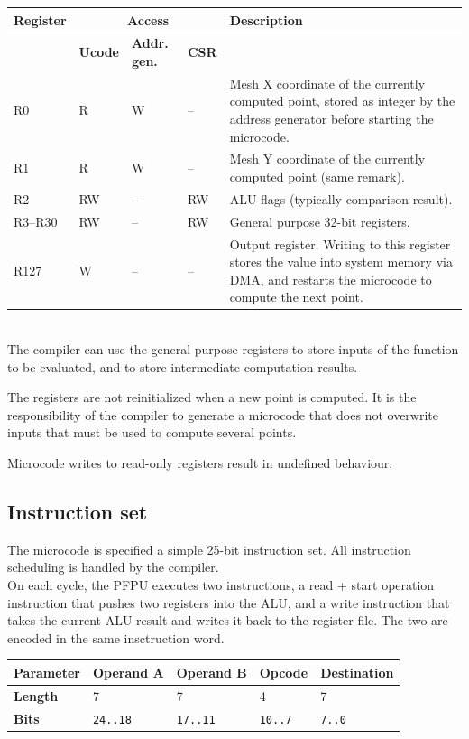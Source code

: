 \documentclass[a4paper,11pt]{article}
\begin{document}
\begin{tabularx}{\textwidth}{|l|l|l|l|X|}
\hline
\bf Register & \multicolumn{3}{|c|}{\bf Access} & \bf Description \\
\hline
 & \bf Ucode & \bf Addr. gen. & \bf CSR & \\
\hline
R0 & R & W & -- & Mesh X coordinate of the currently computed point, stored as integer by the address generator before starting the microcode. \\
\hline
R1 & R & W & -- & Mesh Y coordinate of the currently computed point (same remark). \\
\hline
R2 & RW & -- & RW & ALU flags (typically comparison result). \\
\hline
R3--R30 & RW & -- & RW & General purpose 32-bit registers. \\
\hline
R127 & W & -- & -- & Output register. Writing to this register stores the value into system memory via DMA, and restarts the microcode to compute the next point. \\
\hline
\end{tabularx}\\

The compiler can use the general purpose registers to store inputs of the function to be evaluated, and to store intermediate computation results.

The registers are not reinitialized when a new point is computed. It is the responsibility of the compiler to generate a microcode that does not overwrite inputs that must be used to compute several points.

Microcode writes to read-only registers result in undefined behaviour.

\subsection{Instruction set}
The microcode is specified a simple 25-bit instruction set. All instruction scheduling is handled by the compiler. \\

On each cycle, the PFPU executes two instructions, a read + start operation instruction that pushes two registers into the ALU, and a write instruction that takes the current ALU result and writes it back to the register file. The two are encoded in the same insctruction word. \\

\begin{tabular}{|l|l|l|l|l|}
\hline
\bf Parameter & Operand A & Operand B &  Opcode & Destination \\
\hline
\bf Length & 7 & 7 & 4 & 7 \\
\hline
\bf Bits & \verb!24..18! & \verb!17..11! & \verb!10..7! & \verb!7..0! \\
\hline
\end{tabular}\\
\end{document}
